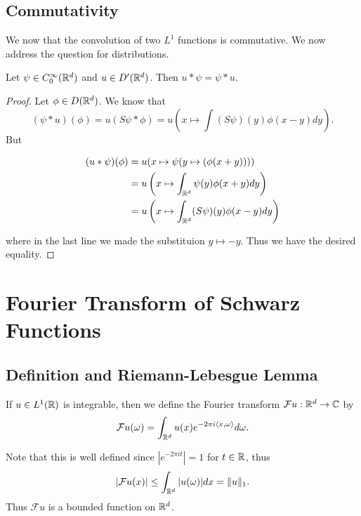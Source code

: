 \documentclass[twoside, a4paper, 10pt]{amsart}
\begin{document}
\subsection{Commutativity}

We now that the convolution of two $L^1$ functions is commutative. We now address the question for distributions.

\begin{lemma} Let $\psi \in C_0^{\infty}(\mathbb{R}^d)$ and $u \in D'(\mathbb{R}^d)$. Then $u * \psi = \psi * u$.

\end{lemma}

\begin{proof} Let $\phi \in D(\mathbb{R}^d)$. We know that $$(\psi * u)(\phi) = u(S\psi * \phi) = u\left(x \mapsto \int (S\psi)(y) \phi(x-y) dy \right).$$ But 

\begin{align*} (u*\psi)(\phi) &= u(x \mapsto \psi(y \mapsto (\phi(x+y)))) \\ &= u\left( x \mapsto \int_{\mathbb{R}^d} \psi(y)\phi(x+y) dy \right) \\ &= u\left( x \mapsto \int_{\mathbb{R}^d} (S\psi)(y)\phi(x-y) dy \right)  \end{align*} 

where in the last line we made the substituion $y \mapsto -y$. Thus we have the desired equality. \end{proof}

\section{Fourier Transform of Schwarz Functions}

\subsection{Definition and Riemann-Lebesgue Lemma}

\begin{mydef} If $u \in L^1(\mathbb{R})$ is integrable, then we define the Fourier transform $\mathcal{F}u:\mathbb{R}^d \to \mathbb{C}$ by $$\mathcal{F}u(\omega) = \int_{\mathbb{R}^d} u(x) e^{-2\pi i \langle x, \omega \rangle } d\omega.$$

\end{mydef}

Note that this is well defined since $|e^{-2\pi it}| = 1$ for $t \in \mathbb{R}$, thus $$|\mathcal{F}u(x)| \leq \int_{\mathbb{R}^d} |u(\omega)| dx = \| u \|_1. $$ Thus $\mathcal{F}u$ is a bounded function on $\mathbb{R}^d$.
\end{document}
